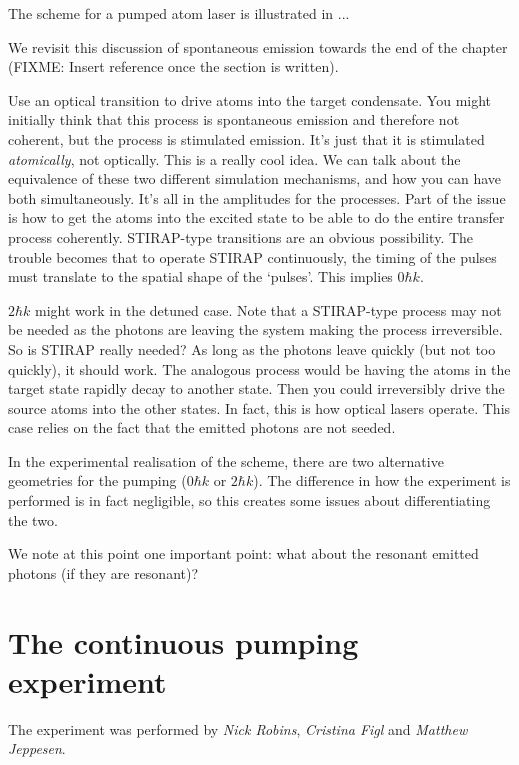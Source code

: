 The scheme for a pumped atom laser is illustrated in ...





We revisit this discussion of spontaneous emission towards the end of the chapter (FIXME: Insert reference once the section is written).


Use an optical transition to drive atoms into the target condensate.  You might initially think that this process is spontaneous emission and therefore not coherent, but the process is stimulated emission.  It's just that it is stimulated \emph{atomically}, not optically.  This is a really cool idea.  We can talk about the equivalence of these two different simulation mechanisms, and how you can have both simultaneously.  It's all in the amplitudes for the processes.  Part of the issue is how to get the atoms into the excited state to be able to do the entire transfer process coherently.  STIRAP-type transitions are an obvious possibility.  The trouble becomes that to operate STIRAP continuously, the timing of the pulses must translate to the spatial shape of the `pulses'.  This implies $0 \hbar k$.

$2 \hbar k$ might work in the detuned case.  Note that a STIRAP-type process may not be needed as the photons are leaving the system making the process irreversible.  So is STIRAP really needed? As long as the photons leave quickly (but not too quickly), it should work.  The analogous process would be having the atoms in the target state rapidly decay to another state. Then you could irreversibly drive the source atoms into the other states.  In fact, this is how optical lasers operate.  This case relies on the fact that the emitted photons are not seeded.

In the experimental realisation of the scheme, there are two alternative geometries for the pumping ($0\hbar k$ or $2 \hbar k$).  The difference in how the experiment is performed is in fact negligible, so this creates some issues about differentiating the two.  

We note at this point one important point: what about the resonant emitted photons (if they are resonant)?

\section{The continuous pumping experiment}
\label{OpticalPumping:ContinuousExperiment}

The experiment was performed by \emph{Nick Robins}, \emph{Cristina Figl} and \emph{Matthew Jeppesen}.

